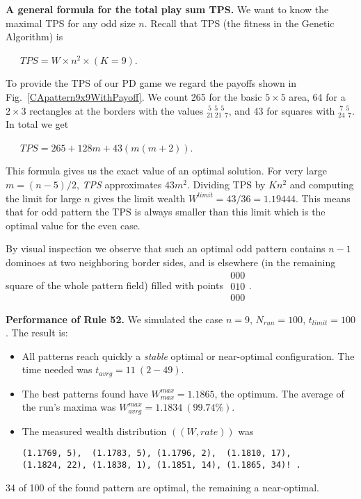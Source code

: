 \documentclass[10pt,a4paper]{article}  %
\begin{document}
\textbf{A general formula for the total play sum TPS.}
We want to know the maximal TPS for any odd size $n$.
Recall that TPS (the fitness in the Genetic Algorithm) is 

~~~$\textit{TPS} = W\times n^2 \times (K=9)$.
 
To provide the TPS of our PD game we regard the payoffs
shown in Fig.~\ref{CApattern9x9WithPayoff}. 
We count 265 for the basic $5\times5$ area,
64 for a $2 \times 3$ rectangles at the borders with the values $^{~5~~5~~5}_{21~21~~7}$,
and 43 for squares with $^{~7~~5}_{24~~7}$. In total we get

~~~$\textit{TPS} = 265 + 128m + 43(m(m+2))$.

This formula gives us the exact value of an optimal solution. 
For very large $m=(n-5)/2$, \textit{TPS} approximates $43m^2$.
Dividing TPS by $Kn^2$ and computing the limit for large $n$
gives the limit wealth $W^{limit}=43/36= 1.19444$. This means
that for odd pattern the TPS is always smaller than this limit
which is the optimal value for the even case. 

By visual inspection we observe that such an optimal odd pattern 
contains $n-1$ dominoes at two neighboring border sides, 
and is  elsewhere (in the remaining square of the whole pattern field) filled with  points
$\substack{000
         \\010
         \\000}$.          
        
\textbf{Performance of  Rule 52.}     
We simulated the case $n=9$, $N_{run}=100$, $t_{limit}=100$.
The result is:
\begin{itemize}
	\item 
    All patterns reach quickly a \textit{stable} optimal or near-optimal configuration.
    The  time needed was $t_{avrg}= 11 ~(2 -49)$.
    \item
    The best patterns found have $W^{max}_{max}=1.1865$, the optimum.
    The average of the run's maxima was $W^{max}_{avrg}=1.1834 ~(99.74\%)$. 
    \item
    The measured wealth distribution $((W, rate))$ was  
      
    \footnotesize
    \begin{verbatim}
(1.1769, 5),  (1.1783, 5), (1.1796, 2),  (1.1810, 17), 
(1.1824, 22), (1.1838, 1), (1.1851, 14), (1.1865, 34)! .
    \end{verbatim}
    \normalsize  

\end{itemize}
34 of 100 of the found pattern are optimal, the remaining a near-optimal.
\end{document}
